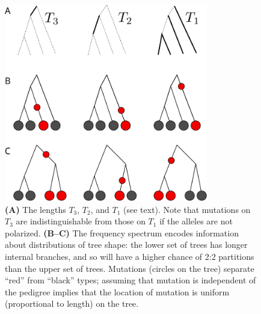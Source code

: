 \begin{figure}[ht!]
  \begin{center}
    \includegraphics[width=3.5in]{frequency-spectra-trees}
  \end{center}
  \caption{
  \textbf{(A)} The lengths $T_3$, $T_2$, and $T_1$ (see text).
  Note that mutations on $T_3$ are indistinguishable from those on  $T_1$ if the alleles are not polarized.
  \textbf{(B--C)}
  The frequency spectrum encodes information about distributions of tree shape:
  the lower set of trees has longer internal branches, and so will have a higher chance of 2:2 partitions
  than the upper set of trees.
  Mutations (circles on the tree) separate ``red'' from ``black'' types;
  assuming that mutation is independent of the pedigree implies
  that the location of mutation is uniform (proportional to length) on the tree.
  \label{fig:frequency_spectra_trees}
  }
\end{figure}

